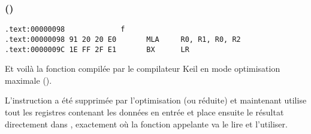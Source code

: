 ﻿\subsubsection{\OptimizingKeilVI (\ARMMode)}

\begin{lstlisting}[label=ARM_leaf_example1,style=customasmARM]
.text:00000098             f
.text:00000098 91 20 20 E0       MLA     R0, R1, R0, R2
.text:0000009C 1E FF 2F E1       BX      LR
\end{lstlisting}


Et voilà la fonction \ttf compilée par le compilateur Keil en mode optimisation
maximale (\Othree).

L'instruction \MOV a été supprimée par l'optimisation (ou réduite) et maintenant
 utilise tout les registres contenant les données en entrée et place ensuite
le résultat directement dans , exactement où la fonction appelante va le lire
et l'utiliser.
